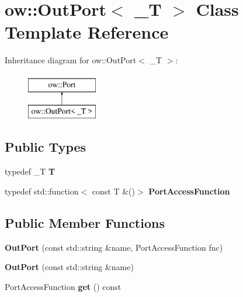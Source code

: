 \hypertarget{classow_1_1OutPort}{}\section{ow\+:\+:Out\+Port$<$ \+\_\+T $>$ Class Template Reference}
\label{classow_1_1OutPort}
Inheritance diagram for ow\+:\+:Out\+Port$<$ \+\_\+T $>$\+:\begin{figure}[H]
\begin{center}
\leavevmode
\includegraphics[height=2.000000cm]{de/d97/classow_1_1OutPort}
\end{center}
\end{figure}
\subsection*{Public Types}
\begin{DoxyCompactItemize}
\item 
typedef \+\_\+T {\bfseries T}\hypertarget{classow_1_1OutPort_a4beedba3a78b474508afc187f85529cd}{}\label{classow_1_1OutPort_a4beedba3a78b474508afc187f85529cd}

\item 
typedef std\+::function$<$ const T \&()$>$ {\bfseries Port\+Access\+Function}\hypertarget{classow_1_1OutPort_a16c7e32a7bfa161e454ad0f5e82cccbf}{}\label{classow_1_1OutPort_a16c7e32a7bfa161e454ad0f5e82cccbf}

\end{DoxyCompactItemize}
\subsection*{Public Member Functions}
\begin{DoxyCompactItemize}
\item 
{\bfseries Out\+Port} (const std\+::string \&name, Port\+Access\+Function fnc)\hypertarget{classow_1_1OutPort_aa9b7eb34a6957296a9bc5fa082ea5465}{}\label{classow_1_1OutPort_aa9b7eb34a6957296a9bc5fa082ea5465}

\item 
{\bfseries Out\+Port} (const std\+::string \&name)\hypertarget{classow_1_1OutPort_abcb51bd6348523b86fd731dfd3f31e3e}{}\label{classow_1_1OutPort_abcb51bd6348523b86fd731dfd3f31e3e}

\item 
Port\+Access\+Function {\bfseries get} () const \hypertarget{classow_1_1OutPort_ae099cebe68b8f33df3fa1fc72b0dd987}{}\label{classow_1_1OutPort_ae099cebe68b8f33df3fa1fc72b0dd987}

\end{DoxyCompactItemize}
